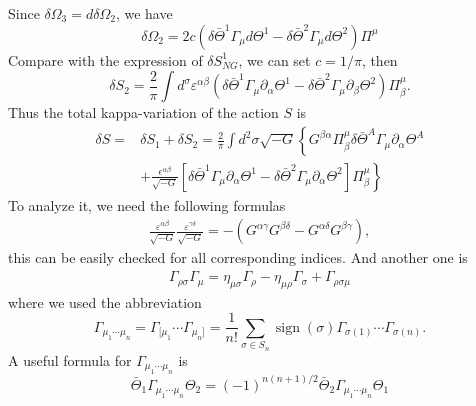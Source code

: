\documentclass[graybox,envcountchap,sectrefs]{svmono}
\begin{document}
Since $\delta \Omega_3=d\delta \Omega_2$, we have
\begin{equation}
\delta \Omega_2=	2 c\left(\delta \bar{\Theta}^{1} \Gamma_{\mu} d \Theta^{1}-\delta \bar{\Theta}^{2} \Gamma_{\mu} d \Theta^{2}\right) \Pi^{\mu}
\end{equation}
Compare with the expression of $\delta S_{NG}^1$, we can set $c=1/\pi$, then
\begin{equation}
\delta S_2=\frac{2}{\pi}\int d^\sigma \varepsilon^{\alpha\beta}	\left(\delta \bar{\Theta}^{1} \Gamma_{\mu} \partial_{\alpha}\Theta^{1}-\delta \bar{\Theta}^{2} \Gamma_{\mu} \partial_{\beta} \Theta^{2}\right) \Pi^{\mu}_{\beta}.
\end{equation}
Thus the total kappa-variation of the action $S$ is 
\begin{equation}
\begin{aligned}
\delta S=& \delta S_{1}+\delta S_{2}=\frac{2}{\pi} \int d^{2} \sigma \sqrt{-G}\left\{G^{\beta \alpha} \Pi_{\beta}^{\mu} \delta \bar{\Theta}^{A} \Gamma_{\mu} \partial_{\alpha} \Theta^{A}\right.\\
&\left.+\frac{\epsilon^{\alpha \beta}}{\sqrt{-G}}\left[\delta \bar{\Theta}^{1} \Gamma_{\mu} \partial_{\alpha} \Theta^{1}-\delta \bar{\Theta}^{2} \Gamma_{\mu} \partial_{\alpha} \Theta^{2}\right] \Pi_{\beta}^{\mu}\right\}
\end{aligned}
\end{equation}
To analyze it, we need the following formulas
\begin{align}\label{eq:epG}
\frac{\varepsilon^{\alpha \beta}}{\sqrt{-G}} \frac{\varepsilon^{\gamma \delta}}{\sqrt{-G}}=-\left(G^{\alpha \gamma} G^{\beta \delta}-G^{\alpha \delta} G^{\beta \gamma}\right),
\end{align}
this can be easily checked for all corresponding indices.
And another one is
\begin{align}\label{eq:mgamma1}
\Gamma_{\rho \sigma} \Gamma_{\mu}=\eta_{\mu \sigma} \Gamma_{\rho}-\eta_{\mu \rho} \Gamma_{\sigma}+\Gamma_{\rho \sigma \mu}
\end{align}
where we used the abbreviation
\begin{equation}
\Gamma_{\mu_1\cdots\mu_n}=\Gamma_{[\mu_1}\cdots \Gamma_{\mu_n]}=\frac{1}{n!}\sum_{\sigma\in S_n}\operatorname{sign}(\sigma) \Gamma_{\sigma (1)}\cdots \Gamma_{\sigma (n)}.	
\end{equation}
A useful formula for $\Gamma_{\mu_1\cdots\mu_n}$ is
\begin{equation}\label{eq:mgamma2}
\bar{\Theta}_{1} \Gamma_{\mu_{1} \cdots \mu_{n}} \Theta_{2}=(-1)^{n(n+1) / 2} \bar{\Theta}_{2} \Gamma_{\mu_{1} \cdots \mu_{n}} \Theta_{1}
\end{equation}
\end{document}
